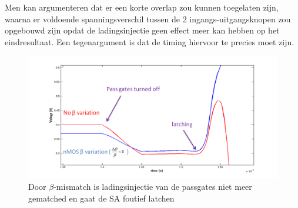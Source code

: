 Men kan argumenteren dat er een korte overlap zou kunnen toegelaten zijn, waarna er voldoende spanningsverschil tussen de 2 ingangs-uitgangsknopen zou opgebouwd zijn opdat de ladingsinjectie geen effect meer kan hebben op het eindresultaat. Een tegenargument is dat de timing hiervoor te precies moet zijn.
\begin{figure}
  \centering
  \includegraphics[scale=0.4]{../fig/hfdstk-sensamp-chargeinjectionmismatch.png}
  \caption[foutief latchen door $\beta$-mismatch]{Door $\beta$-mismatch is ladingsinjectie van de passgates niet meer gematched en gaat de SA foutief latchen}
  \label{fig:chargeinjectionmismatch}
\end{figure}

